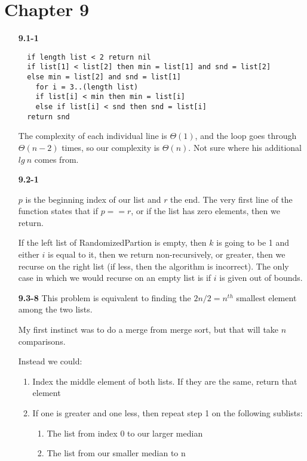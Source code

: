 \documentclass{article}
\begin{document}
\section*{Chapter 9}

\begin{enumerate}

\item[\textbf{9.1-1}]

	\begin{verbatim}
  if length list < 2 return nil
  if list[1] < list[2] then min = list[1] and snd = list[2]
  else min = list[2] and snd = list[1]
	for i = 3..(length list)
    if list[i] < min then min = list[i]
    else if list[i] < snd then snd = list[i]
  return snd
	\end{verbatim}

	The complexity of each individual line is $\Theta(1)$, and the loop goes through $\Theta(n-2)$ times, so our complexity is $\Theta(n)$. Not sure where his additional $lg\ n$ comes from.

\item[\textbf{9.2-1}]

	$p$ is the beginning index of our list and $r$ the end. The very first line of the function states that if $p == r$, or if the list has zero elements, then we return.

	If the left list of RandomizedPartion is empty, then $k$ is going to be 1 and
	either $i$ is equal to it, then we return non-recursively, or greater, then
	we recurse on the right list (if less, then the algorithm is incorrect). The
	only case in which we would recurse on an empty list is if $i$ is given out
	of bounds.

\item[\textbf{9.3-8}]
	This problem is equivalent to finding the $2n/2 = n^{th}$ smallest element among the two lists.

	My first instinct was to do a merge from merge sort, but that will take $n$ comparisons.

	Instead we could:
	
	\begin{enumerate}
		\item Index the middle element of both lists. If they are the same, return that element
		\item If one is greater and one less, then repeat step 1 on the following sublists:
			\begin{enumerate}
				\item The list from index 0 to our larger median
				\item The list from our smaller median to n
			\end{enumerate}
	\end{enumerate}


\end{enumerate}
\end{document}
